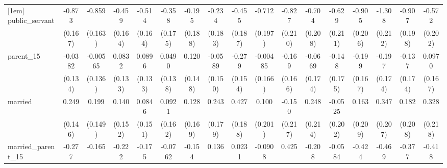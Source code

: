 {\begin{tabular}{l*{16}{c}}
[1em]
public\_servant      &      -0.873\sym{***}&      -0.859\sym{***}&      -0.459\sym{**} &      -0.514\sym{**} &      -0.358\sym{*}  &      -0.195         &      -0.234         &      -0.455\sym{*}  &      -0.712\sym{***}&      -0.827\sym{***}&      -0.704\sym{***}&      -0.629\sym{**} &      -0.905\sym{***}&      -1.308\sym{***}&      -0.907\sym{***}&      -0.572\sym{**} \\
                    &     (0.167)         &     (0.163)         &     (0.164)         &     (0.164)         &     (0.175)         &     (0.188)         &     (0.183)         &     (0.187)         &     (0.197)         &     (0.210)         &     (0.208)         &     (0.211)         &     (0.206)         &     (0.212)         &     (0.198)         &     (0.202)         \\
[1em]
parent\_15           &     -0.0382         &    -0.00565         &      0.0832         &      0.0896         &      0.0490         &       0.120         &     -0.0589         &      -0.279         &    -0.00485         &      -0.169         &     -0.0669         &      -0.148         &      -0.199         &      -0.197         &      -0.137         &      0.0970         \\
                    &     (0.134)         &     (0.136)         &     (0.133)         &     (0.133)         &     (0.138)         &     (0.148)         &     (0.150)         &     (0.154)         &     (0.166)         &     (0.166)         &     (0.174)         &     (0.175)         &     (0.167)         &     (0.174)         &     (0.174)         &     (0.167)         \\
[1em]
married             &       0.249         &       0.199         &       0.140         &      0.0846         &      0.0921         &       0.128         &       0.243         &       0.427\sym{*}  &       0.100         &      -0.150         &       0.248         &     -0.0525         &       0.163         &       0.347         &       0.182         &       0.328         \\
                    &     (0.146)         &     (0.149)         &     (0.152)         &     (0.151)         &     (0.162)         &     (0.169)         &     (0.179)         &     (0.188)         &     (0.201)         &     (0.217)         &     (0.214)         &     (0.202)         &     (0.209)         &     (0.207)         &     (0.208)         &     (0.218)         \\
[1em]
married\_parent\_15   &      -0.277         &      -0.165         &      -0.222         &      -0.175         &     -0.0762         &      -0.154         &       0.136         &      0.0231         &     -0.0908         &       0.425         &      -0.208         &     -0.0584         &      -0.424         &      -0.469         &      -0.377         &      -0.418         \\

\end{tabular}}
